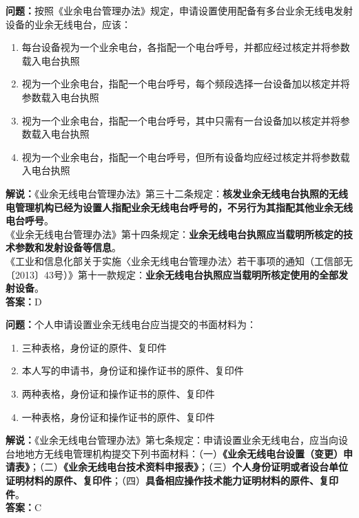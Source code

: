 \bigskip


\noindent\textbf{问题：}按照《业余电台管理办法》规定，申请设置使用配备有多台业余无线电发射设备的业余无线电台，应该：
\begin{enumerate}[label=\Alph*), leftmargin=3em]
	\item 每台设备视为一个业余电台，各指配一个电台呼号，并都应经过核定并将参数载入电台执照
	\item 视为一个业余电台，指配一个电台呼号，每个频段选择一台设备加以核定并将参数载入电台执照
	\item 视为一个业余电台，指配一个电台呼号，其中只需有一台设备加以核定并将参数载入电台执照
	\item 视为一个业余电台，指配一个电台呼号，但所有设备均应经过核定并将参数载入电台执照
\end{enumerate}
\noindent\textbf{解说：}《业余无线电台管理办法》第三十二条规定：\textbf{核发业余无线电台执照的无线电管理机构已经为设置人指配业余无线电台呼号的，不另行为其指配其他业余无线电台呼号}。\\
《业余无线电台管理办法》第十四条规定：\textbf{业余无线电台执照应当载明所核定的技术参数和发射设备等信息}。\\
《工业和信息化部关于实施〈业余无线电台管理办法〉若干事项的通知（工信部无〔2013〕43号）》第十一款规定：\textbf{业余无线电台执照应当载明所核定使用的全部发射设备}。\\\noindent\textbf{答案：}D


\bigskip


\noindent\textbf{问题：}个人申请设置业余无线电台应当提交的书面材料为：
\begin{enumerate}[label=\Alph*), leftmargin=3em]
	\item 三种表格，身份证的原件、复印件
	\item 本人写的申请书，身份证和操作证书的原件、复印件
	\item 两种表格，身份证和操作证书的原件、复印件
	\item 一种表格，身份证和操作证书的原件、复印件
\end{enumerate}
\noindent\textbf{解说：}《业余无线电台管理办法》第七条规定：申请设置业余无线电台，应当向设台地地方无线电管理机构提交下列书面材料：（一）\textbf{《业余无线电台设置（变更）申请表》}；（二）\textbf{《业余无线电台技术资料申报表》}；（三）\textbf{个人身份证明或者设台单位证明材料的原件、复印件}；（四）\textbf{具备相应操作技术能力证明材料的原件、复印件}。\\\noindent\textbf{答案：}C


\bigskip



